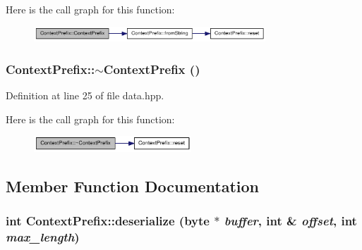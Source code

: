 Here is the call graph for this function:\nopagebreak
\begin{figure}[H]
\begin{center}
\leavevmode
\includegraphics[width=246pt]{struct_context_prefix_a967de73f3ce083123324c5a03e69d5c8_cgraph}
\end{center}
\end{figure}
\hypertarget{struct_context_prefix_a5f55e9348a101c600946f76034d6f93f}{
\subsubsection[{$\sim$ContextPrefix}]{\setlength{\rightskip}{0pt plus 5cm}ContextPrefix::$\sim$ContextPrefix ()}}
\label{struct_context_prefix_a5f55e9348a101c600946f76034d6f93f}


Definition at line 25 of file data.hpp.

Here is the call graph for this function:\nopagebreak
\begin{figure}[H]
\begin{center}
\leavevmode
\includegraphics[width=167pt]{struct_context_prefix_a5f55e9348a101c600946f76034d6f93f_cgraph}
\end{center}
\end{figure}


\subsection{Member Function Documentation}
\hypertarget{struct_context_prefix_aaacd69ff83b8a9788a603eaed58cd4e5}{
\subsubsection[{deserialize}]{\setlength{\rightskip}{0pt plus 5cm}int ContextPrefix::deserialize ({\bf byte} $\ast$ {\em buffer}, \/  int \& {\em offset}, \/  int {\em max\_\-length})}}
\label{struct_context_prefix_aaacd69ff83b8a9788a603eaed58cd4e5}


